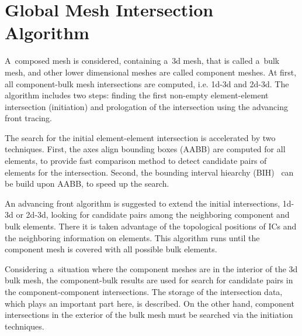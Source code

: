 \section{Global Mesh Intersection Algorithm}
\label{sec:front_advancing}
A~composed mesh is considered, containing a~3d mesh, that is called a~bulk mesh, and
other lower dimensional meshes are called component meshes. 
At first, all component-bulk mesh intersections are computed, i.e. 1d-3d and 2d-3d.
The algorithm includes two steps: finding the first non-empty element-element intersection (initiation)
and prologation of the intersection using the advancing front tracing.

The search for the initial element-element intersection is accelerated by two techniques.
First, the axes align bounding boxes (AABB) are computed for all elements, to provide fast
comparison method to detect candidate pairs of elements for the intersection.
Second, the bounding interval hiearchy (BIH)~\cite{wachter_instant_2006} can be build upon AABB, to speed up the search.

An advancing front algorithm is suggested to extend the initial intersections, 1d-3d or 2d-3d,
looking for candidate pairs among the neighboring component and bulk elements.
There it is taken advantage of the topological positions of ICs and the neighboring information on elements.
This algorithm runs until the component mesh is covered with all possible bulk elements.

Considering a~situation where the component meshes are in the interior of the 3d bulk mesh,
the component-bulk results are used for search for candidate pairs in the component-component intersections.
The storage of the intersection data, which plays an important part here, is described.
On the other hand, component intersections in the exterior of the bulk mesh must be searched via the initiation
techniques.


